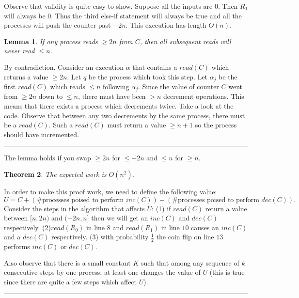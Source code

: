 \documentclass[twoside]{article}
\newcounter{lecnum}
\newtheorem{theorem}{Theorem}[lecnum]
\newtheorem{lemma}[theorem]{Lemma}
\newenvironment{proof}{{\bf Proof:}}{\hfill\rule{2mm}{2mm}}
\begin{document}
Observe that validity is quite easy to show. Suppose all the inputs are $0$. Then $R_1$ will always be $0$. Thus the third else-if statement will always be true and all the processes will push the counter past $-2n$. This execution has length $O(n)$.

\begin{lemma}
\label{lem:reachedendzone}
If any process reads $\geq 2n$ from $C$, then all subsequent reads will never read $\leq n$. 
\end{lemma}   
\begin{proof}
By contradiction. Consider an execution $\alpha$ that contains a $read(C)$ which returns a value $\geq 2n$. Let $q$ be the process which took this step. Let $\alpha_j$ be the first $read(C)$ which reads $\leq n$ following $\alpha_j$. Since the value of counter $C$ went from $\geq 2n$ down to $\leq n$, there must have been $> n$ decrement operations. This means that there exists a process which decrements twice. Take a look at the code. Observe that between any two decrements by the same process, there must be a $read(C)$. Such a $read(C)$ must return a value $\geq n + 1$ so the process should have incremented.   
\end{proof}

The lemma holds if you swap $\geq 2n$ for $\leq -2n$ and $\leq n$ for $\geq n$. 

\begin{theorem}
The expected work is $O(n^2)$.
\end{theorem}
\begin{proof}
In order to make this proof work, we need to define the following value:
\[U = C + (\mbox{\# processes poised to perform }inc(C)) - (\mbox{\# processes poised to perform  }dec(C)).\]
Consider the steps in the algorithm that affects $U$: (1) if $read(C)$ return a value between $[n, 2n)$ and $(-2n, n]$ then we will get an $inc(C)$ and $dec(C)$ respectively. (2)$read(R_0)$ in line $8$ and $read(R_1)$ in line $10$ causes an $inc(C)$ and a $dec(C)$ respectively. (3) with probability $\frac{1}{2}$ the coin flip on line $13$ performs $inc(C)$ or $dec(C)$. 

Also observe that there is a small constant $K$ such that among any sequence of $k$ consecutive steps by one process, at least one changes the value of $U$ (this is true since there are quite a few steps which affect $U$).
\end{proof}
\end{document}
